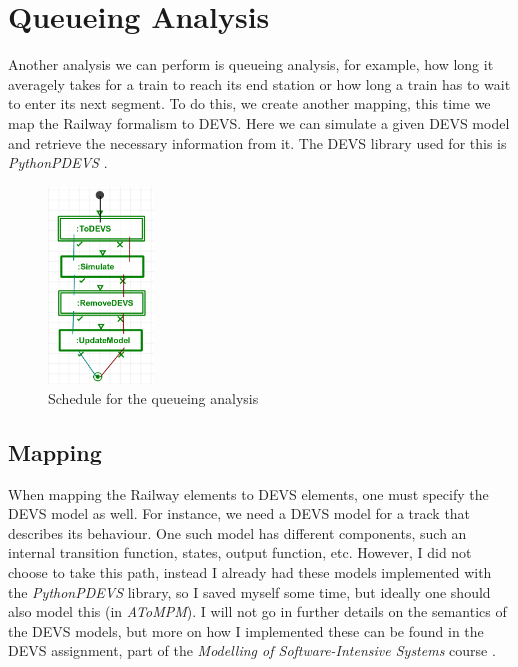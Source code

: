 \documentclass{article}
\begin{document}

\section{Queueing Analysis}

Another analysis we can perform is queueing analysis, for example, how long it averagely takes for a train to reach its end station or how long a train has to wait to enter its next segment. To do this, we create another mapping, this time we map the Railway formalism to DEVS. Here we can simulate a given DEVS model and retrieve the necessary information from it. The DEVS library used for this is \textit{PythonPDEVS} \cite{pythonpdevs}.

\begin{figure}[H]
    \centering
    \includegraphics[width=0.25\textwidth]{images/queueing_analysis_schedule.png}
    \caption{Schedule for the queueing analysis}
    \label{schedule_queueing}
\end{figure}

\subsection{Mapping}

When mapping the Railway elements to DEVS elements, one must specify the DEVS model as well. For instance, we need a DEVS model for a track that describes its behaviour. One such model has different components, such an internal transition function, states, output function, etc. However, I did not choose to take this path, instead I already had these models implemented with the \textit{PythonPDEVS} library, so I saved myself some time, but ideally one should also model this (in \textit{AToMPM}). I will not go in further details on the semantics of the DEVS models, but more on how I implemented these can be found in the DEVS assignment, part of the \textit{Modelling of Software-Intensive Systems} course \cite{devs_assignment}.
\end{document}
